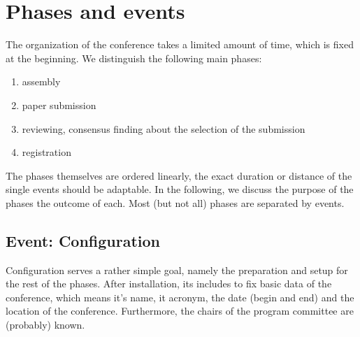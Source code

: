 \section{Phases and events}
\label{sec:phases}%

The organization of the conference takes a limited amount of time, which is
fixed at the beginning. We distinguish the following main phases:
\begin{enumerate}
\item assembly
\item paper submission
\item reviewing, consensus finding about the selection of the submission
\item registration
\end{enumerate}

The phases themselves are ordered linearly, the exact duration or distance
of the single events should be adaptable. In the following, we discuss the
purpose of the phases the outcome of each. Most (but not all) phases are
separated by events.


\medskip



\iffalse
\paragraph{A word of warning} 
The following phases reflect an idealized situation, where all phases are
cleanly separated, all actors in the game do the correct things etc.
Sometimes this will not be the case. Clearly, a user must be able to
correct information he provided; one instance is described in
Section~\ref{sec:submission}, where a submission is replaced by a newer
one. 
\fi










\subsection{Event: Configuration}
\label{sec:configuration}

Configuration serves a rather simple goal, namely the preparation and setup
for the rest of the phases. After installation, its includes to fix basic
data of the conference, which means it's name, it acronym, the date (begin
and end) and the location of the conference. Furthermore, the chairs of the
program committee are (probably) known.






